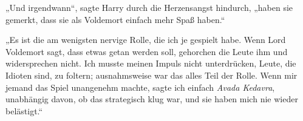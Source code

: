 „Und irgendwann“, sagte Harry durch die Herzensangst hindurch, „haben sie gemerkt, dass sie als Voldemort einfach mehr Spaß haben.“

„Es ist die am wenigsten nervige Rolle, die ich je gespielt habe. Wenn Lord Voldemort sagt, dass etwas getan werden soll, gehorchen die Leute ihm und widersprechen nicht. Ich musste meinen Impuls nicht unterdrücken, Leute, die Idioten sind, zu foltern; ausnahmsweise war das alles Teil der Rolle. Wenn mir jemand das Spiel unangenehm machte, sagte ich einfach \emph{Avada Kedavra}, unabhängig davon, ob das strategisch klug war, und sie haben mich nie wieder belästigt.“
